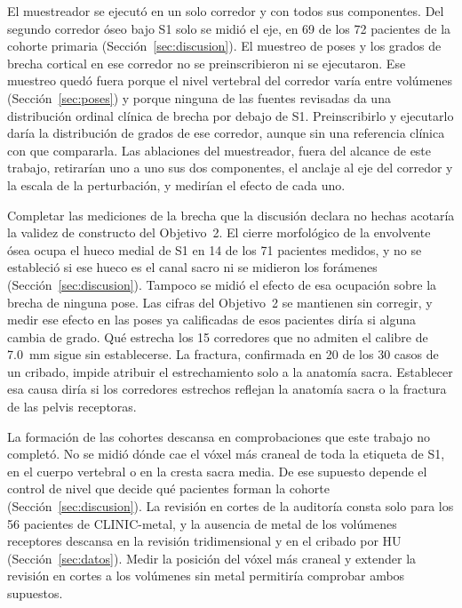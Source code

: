 El muestreador se ejecutó en un solo corredor y con todos sus componentes. Del segundo corredor óseo bajo S1 solo se midió el eje, en 69 de los 72 pacientes de la cohorte primaria (Sección~\ref{sec:discusion}). El muestreo de poses y los grados de brecha cortical en ese corredor no se preinscribieron ni se ejecutaron. Ese muestreo quedó fuera porque el nivel vertebral del corredor varía entre volúmenes (Sección~\ref{sec:poses}) y porque ninguna de las fuentes revisadas da una distribución ordinal clínica de brecha por debajo de S1. Preinscribirlo y ejecutarlo daría la distribución de grados de ese corredor, aunque sin una referencia clínica con que compararla. Las ablaciones del muestreador, fuera del alcance de este trabajo, retirarían uno a uno sus dos componentes, el anclaje al eje del corredor y la escala de la perturbación, y medirían el efecto de cada uno.

Completar las mediciones de la brecha que la discusión declara no hechas acotaría la validez de constructo del Objetivo~2. El cierre morfológico de la envolvente ósea ocupa el hueco medial de S1 en 14 de los 71 pacientes medidos, y no se estableció si ese hueco es el canal sacro ni se midieron los forámenes (Sección~\ref{sec:discusion}). Tampoco se midió el efecto de esa ocupación sobre la brecha de ninguna pose. Las cifras del Objetivo~2 se mantienen sin corregir, y medir ese efecto en las poses ya calificadas de esos pacientes diría si alguna cambia de grado. Qué estrecha los 15 corredores que no admiten el calibre de 7.0~mm sigue sin establecerse. La fractura, confirmada en 20 de los 30 casos de un cribado, impide atribuir el estrechamiento solo a la anatomía sacra. Establecer esa causa diría si los corredores estrechos reflejan la anatomía sacra o la fractura de las pelvis receptoras.

La formación de las cohortes descansa en comprobaciones que este trabajo no completó. No se midió dónde cae el vóxel más craneal de toda la etiqueta de S1, en el cuerpo vertebral o en la cresta sacra media. De ese supuesto depende el control de nivel que decide qué pacientes forman la cohorte (Sección~\ref{sec:discusion}). La revisión en cortes de la auditoría consta solo para los 56 pacientes de CLINIC-metal, y la ausencia de metal de los volúmenes receptores descansa en la revisión tridimensional y en el cribado por HU (Sección~\ref{sec:datos}). Medir la posición del vóxel más craneal y extender la revisión en cortes a los volúmenes sin metal permitiría comprobar ambos supuestos.


